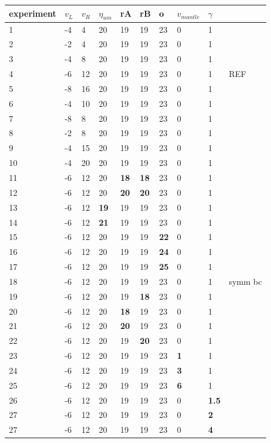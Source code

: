 \begin{center}
\begin{tabular}{llllllllll}
\hline
experiment & $v_L$ & $v_R$ & $\eta_{um}$ &rA &rB &o & $v_{mantle}$ & $\gamma$\\ 
\hline
\hline
1 & -4 &  4& 20&19&19&23&0&1\\
2 & -2 &  4& 20&19&19&23&0&1\\
3 & -4 &  8& 20&19&19&23&0&1\\
4 & -6 & 12& 20&19&19&23&0&1 & REF\\
5 & -8 & 16& 20&19&19&23&0&1\\
6 & -4 & 10& 20&19&19&23&0&1\\
7 & -8 &  8& 20&19&19&23&0&1\\
8 & -2 &  8& 20&19&19&23&0&1\\
9 & -4 & 15& 20&19&19&23&0&1\\
10& -4 & 20& 20&19&19&23&0&1\\
11& -6 & 12& 20       & {\bf 18} &  {\bf 18} & 23&0 &1 \\ 
12& -6 & 12& 20       & {\bf 20} &  {\bf 20} & 23&0 &1 \\ 
13& -6 & 12& {\bf 19} & 19       & 19        & 23&0 &1\\
14& -6 & 12& {\bf 21} & 19       & 19        & 23&0 &1\\
15& -6 & 12& 20       & 19       & 19        & {\bf 22}&0&1\\
16& -6 & 12& 20       & 19       & 19        & {\bf 24}&0&1\\
17& -6 & 12& 20       & 19       & 19        & {\bf 25}&0&1\\
18& -6 & 12& 20       & 19       & 19        & 23&0 &1 &symm bc\\
19& -6 & 12& 20       & 19       & {\bf 18}  & 23&0&1\\
20& -6 & 12& 20       & {\bf 18} & 19        & 23&0&1\\
21& -6 & 12& 20       & {\bf 20} & 19        & 23&0&1\\
22& -6 & 12& 20       &  19      & {\bf 20}  & 23&0&1\\
23& -6 & 12& 20&19&19&23& {\bf 1} & 1\\
24& -6 & 12& 20&19&19&23& {\bf 3} & 1\\
25& -6 & 12& 20&19&19&23& {\bf 6} & 1\\
26& -6 & 12& 20&19&19&23&0 & {\bf 1.5} \\ 
27& -6 & 12& 20&19&19&23&0 & {\bf 2} \\ 
27& -6 & 12& 20&19&19&23&0 & {\bf 4} \\ 
\hline
\end{tabular}
\end{center}

